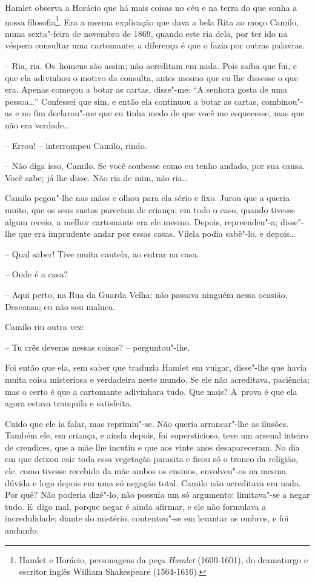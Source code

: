 Hamlet observa a Horácio que há mais coisas no céu e na terra do que
sonha a nossa filosofia\footnote{Hamlet e Horácio, personagens da peça
  \emph{Hamlet} (1600-1601), do dramaturgo e escritor inglês William
  Shakespeare (1564-1616).}. Era a mesma explicação que dava a bela Rita
ao moço Camilo, numa sexta"-feira de novembro de 1869, quando este ria
dela, por ter ido na véspera consultar uma cartomante; a diferença é que
o fazia por outras palavras.

-- Ria, ria. Os~homens são assim; não acreditam em nada. Pois saiba que
fui, e que ela adivinhou o motivo da consulta, antes mesmo que eu lhe
dissesse o que era. Apenas começou a botar as cartas, disse"-me: ``A
senhora gosta de uma pessoa\ldots{}'' Confessei que sim, e então ela
continuou a botar as cartas, combinou"-as e no fim declarou"-me que eu
tinha medo de que você me esquecesse, mas que não era verdade\ldots{}

-- Errou! -- interrompeu Camilo, rindo.

-- Não diga isso, Camilo. Se você soubesse como eu tenho andado, por sua
causa. Você sabe; já lhe disse. Não ria de mim, não ria\ldots{}

Camilo pegou"-lhe nas mãos e olhou para ela sério e fixo. Jurou que a
queria muito, que os seus sustos pareciam de criança; em todo o caso,
quando tivesse algum receio, a melhor cartomante era ele mesmo. Depois,
repreendeu"-a; disse"-lhe que era imprudente andar por essas casas. Vilela
podia sabê"-lo, e depois\ldots{}

-- Qual saber! Tive muita cautela, ao entrar na casa.

-- Onde é a casa?

-- Aqui perto, na Rua da Guarda Velha; não passava ninguém nessa
ocasião. Descansa; eu não sou maluca.

Camilo riu outra vez:

-- Tu crês deveras nessas coisas? -- perguntou"-lhe.

Foi então que ela, sem saber que traduzia Hamlet em vulgar, disse"-lhe
que havia muita coisa misteriosa e verdadeira neste mundo. Se ele não
acreditava, paciência; mas o certo é que a cartomante adivinhara tudo.
Que mais? A~prova é que ela agora estava tranquila e satisfeita.

Cuido que ele ia falar, mas reprimiu"-se. Não queria arrancar"-lhe as
ilusões. Também ele, em criança, e ainda depois, foi supersticioso, teve
um arsenal inteiro de crendices, que a mãe lhe incutiu e que aos vinte
anos desapareceram. No dia em que deixou cair toda essa vegetação
parasita e ficou só o tronco da religião, ele, como tivesse recebido da
mãe ambos os ensinos, envolveu"-os na mesma dúvida e logo depois em uma
só negação total. Camilo não acreditava em nada. Por quê? Não poderia
dizê"-lo, não possuía um só argumento: limitava"-se a negar tudo. E~digo
mal, porque negar é ainda afirmar, e ele não formulava a incredulidade;
diante do mistério, contentou"-se em levantar os ombros, e foi andando.

